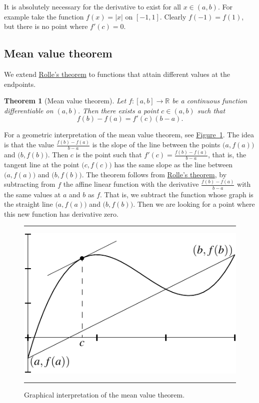 \documentclass[12pt]{book}
\newenvironment{myfigureht}{%
\begin{figure}[h!t]
\noindent\rule{\textwidth}{0.4pt}\vspace{12pt}\par\centering}%
{\par\noindent\rule{\textwidth}{0.4pt}
\end{figure}}
\newcommand{\abs}[1]{\left\lvert {#1} \right\rvert}
\newcommand{\R}{{\mathbb{R}}}
\theoremstyle{plain}
\newtheorem{thm}{Theorem}[section]
\theoremstyle{remark}
\theoremstyle{definition}
\theoremstyle{exercise}
\theoremstyle{example}
\newcommand{\figureref}[1]{\hyperref[#1]{Figure~\ref*{#1}}}
\begin{document}
It is absolutely necessary for the derivative to exist for all $x
\in (a,b)$.  For example take the function $f(x) = \abs{x}$ on $[-1,1]$.
Clearly $f(-1) = f(1)$, but there is no point where $f'(c) = 0$.

\subsection{Mean value theorem}

We extend \hyperref[thm:rolle]{Rolle's theorem}
to functions that attain different
values at the endpoints.

\begin{thm}[Mean value theorem] \label{thm:mvt}
Let $f \colon [a,b] \to \R$ be a continuous function
differentiable on $(a,b)$.  Then there exists a point $c \in (a,b)$
such that
\begin{equation*}
f(b)-f(a) = f'(c)(b-a) .
\end{equation*}
\end{thm}

For a geometric interpretation of the mean value theorem, see
\figureref{mvtfig}.  The idea is that the value $\frac{f(b)-f(a)}{b-a}$
is the slope of the line between the points $\bigl(a,f(a)\bigr)$
and $\bigl(b,f(b)\bigr)$.
Then $c$ is the point such that $f'(c) = \frac{f(b)-f(a)}{b-a}$, that 
is, the tangent line at the point $\bigl(c,f(c)\bigr)$ has the same slope as the
line between $\bigl(a,f(a)\bigr)$ and $\bigl(b,f(b)\bigr)$.
The theorem follows from \hyperref[thm:rolle]{Rolle's theorem},
by subtracting from $f$ the affine linear function with the derivative
$\frac{f(b)-f(a)}{b-a}$ with the same values at $a$ and $b$ as $f$.
That is, we subtract the function whose graph is the straight line
$\bigl(a,f(a)\bigr)$ and $\bigl(b,f(b)\bigr)$.
Then we are looking for a point where this new
function has derivative zero.

\begin{myfigureht}
\includegraphics{figures/mvtfig}
\caption{Graphical interpretation of the mean value theorem.\label{mvtfig}}
\end{myfigureht}
\end{document}
